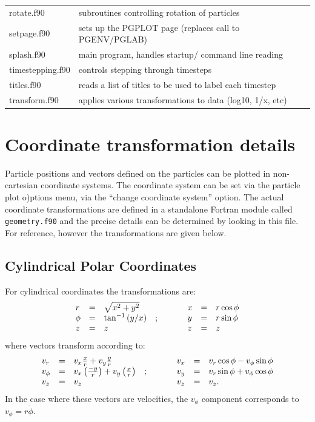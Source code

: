 \documentclass[a4paper,10pt]{article}
\begin{document}
\begin{longtable}{|lp{}|}
     rotate.f90             & subroutines controlling rotation of particles\\
     setpage.f90            & sets up the PGPLOT page (replaces call to PGENV/PGLAB)\\
     splash.f90	 & main program, handles startup/ command line reading\\
     timestepping.f90       & controls stepping through timesteps\\
     titles.f90        & reads a list of titles to be used to label each timestep\\
     transform.f90	 	 & applies various transformations to data (log10, 1/x, etc) \\
\end{longtable}

\section{Coordinate transformation details}
\label{sec:coordtransforms}
Particle positions and vectors defined on the particles can be plotted in non-cartesian coordinate
systems. The coordinate system can be set via the particle plot o)ptions menu, via the ``change coordinate
system'' option. The actual coordinate transformations are defined in a standalone Fortran module called
\verb+geometry.f90+ and the precise details can be determined by looking in this file. For reference, however the transformations are given below.

\subsection{ Cylindrical Polar Coordinates}
For cylindrical coordinates the transformations are:
\begin{displaymath}
\begin{array}{lclp{1cm}lcl}
r & = & \sqrt{x^2 + y^2}    & & x & = & r\cos\phi \\
\phi & = & \tan^{-1}{(y/x)} &; & y & = & r\sin\phi \\
z & = & z                             & & z & = & z\\
\end{array}
\end{displaymath}
where vectors transform according to:
\begin{displaymath}
\begin{array}{lclp{1cm}lcl}
v_r      & = & v_x \frac{x}{r} + v_y \frac{y}{r}  & & v_x & = & v_r \cos\phi - v_\phi \sin\phi \\
v_\phi & = & v_x \left(\frac{-y}{r}\right) + v_y \left(\frac{x}{r}\right) &; &v_y & = & v_r \sin\phi + v_\phi \cos\phi \\
v_z      & = & v_z & & v_z & = & v_z. \\
\end{array}
\end{displaymath}
In the case where these vectors are velocities, the $v_{\phi}$ component corresponds to $v_{\phi} = r\dot{\phi}$.
\end{document}
